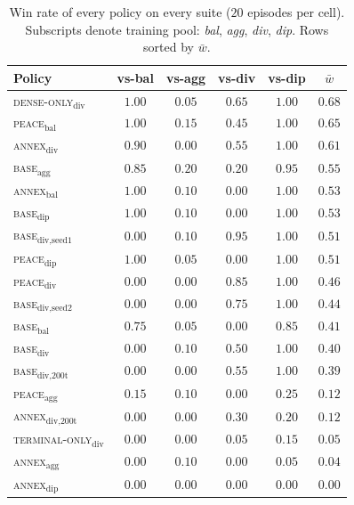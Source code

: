 \documentclass[11pt, a4paper, onecolumn]{article} %
\begin{document}
\begin{table}[H]
\centering
\small
\begin{tabular}{lcccc|c}
\toprule
Policy & vs-bal & vs-agg & vs-div & vs-dip & $\bar{w}$ \\
\midrule
\textsc{dense-only}$_{\text{div}}$       & $1.00$ & $0.05$ & $0.65$ & $1.00$ & $\mathbf{0.68}$ \\
\textsc{peace}$_{\text{bal}}$            & $1.00$ & $0.15$ & $0.45$ & $1.00$ & $0.65$ \\
\textsc{annex}$_{\text{div}}$            & $0.90$ & $0.00$ & $0.55$ & $1.00$ & $0.61$ \\
\textsc{base}$_{\text{agg}}$             & $0.85$ & $0.20$ & $0.20$ & $0.95$ & $0.55$ \\
\textsc{annex}$_{\text{bal}}$            & $1.00$ & $0.10$ & $0.00$ & $1.00$ & $0.53$ \\
\textsc{base}$_{\text{dip}}$             & $1.00$ & $0.10$ & $0.00$ & $1.00$ & $0.53$ \\
\textsc{base}$_{\text{div,seed1}}$       & $0.00$ & $0.10$ & $0.95$ & $1.00$ & $0.51$ \\
\textsc{peace}$_{\text{dip}}$            & $1.00$ & $0.05$ & $0.00$ & $1.00$ & $0.51$ \\
\textsc{peace}$_{\text{div}}$            & $0.00$ & $0.00$ & $0.85$ & $1.00$ & $0.46$ \\
\textsc{base}$_{\text{div,seed2}}$       & $0.00$ & $0.00$ & $0.75$ & $1.00$ & $0.44$ \\
\textsc{base}$_{\text{bal}}$             & $0.75$ & $0.05$ & $0.00$ & $0.85$ & $0.41$ \\
\textsc{base}$_{\text{div}}$             & $0.00$ & $0.10$ & $0.50$ & $1.00$ & $0.40$ \\
\textsc{base}$_{\text{div,200t}}$        & $0.00$ & $0.00$ & $0.55$ & $1.00$ & $0.39$ \\
\textsc{peace}$_{\text{agg}}$            & $0.15$ & $0.10$ & $0.00$ & $0.25$ & $0.12$ \\
\textsc{annex}$_{\text{div,200t}}$       & $0.00$ & $0.00$ & $0.30$ & $0.20$ & $0.12$ \\
\textsc{terminal-only}$_{\text{div}}$    & $0.00$ & $0.00$ & $0.05$ & $0.15$ & $0.05$ \\
\textsc{annex}$_{\text{agg}}$            & $0.00$ & $0.10$ & $0.00$ & $0.05$ & $0.04$ \\
\textsc{annex}$_{\text{dip}}$            & $0.00$ & $0.00$ & $0.00$ & $0.00$ & $0.00$ \\
\bottomrule
\end{tabular}
\caption{Win rate of every policy on every suite ($20$ episodes per cell).
Subscripts denote training pool: \textit{bal}, \textit{agg}, \textit{div},
\textit{dip}. Rows sorted by $\bar{w}$.}
\label{tab:winrate_summary}
\end{table}
\end{document}

